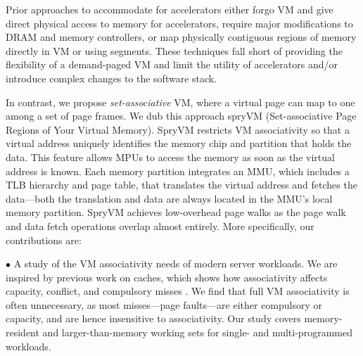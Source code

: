 Prior approaches to accommodate for accelerators either forgo VM and give direct physical access to memory for accelerators\cite{}, require major modifications to DRAM and memory controllers, or map physically contiguous regions of memory directly in VM or using segments\cite{}. These techniques fall short of providing the flexibility of a demand-paged VM and limit the utility of accelerators and/or introduce complex changes to the software stack.



In contrast, we propose {\it set-associative} VM, where a virtual page can map to one among a set of page frames. We dub this approach spryVM (Set-associative Page Regions of Your Virtual Memory). SpryVM restricts VM associativity so that a virtual address uniquely identifies the memory chip and partition that holds the data. This feature allows MPUs to access the memory as soon as the virtual address is known. Each memory partition integrates an MMU, which includes a TLB hierarchy and page table, that translates the virtual address and fetches the data---both the translation and data are always located in the MMU's local memory partition. SpryVM achieves low-overhead page walks as the page walk and data fetch operations overlap almost entirely. More specifically, our contributions are:

\noindent $\bullet$ A study of the VM associativity needs of modern server workloads. We are inspired by previous work on caches, which shows how associativity affects capacity, conflict, and compulsory misses \cite{hill:case}. 
We find that full VM associativity is often unnecessary, as most misses---page faults---are either compulsory or capacity, and are hence insensitive to associativity. Our study covers memory-resident and larger-than-memory working sets for single- and multi-programmed workloads.

